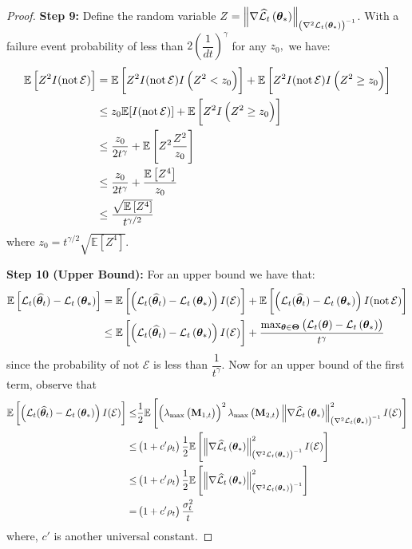 \begin{proof}
\textbf{Step 9:} Define the random variable $Z=\left\|\nabla \widehat{\cal L}_{t}\left(\bm{\theta}_{*}\right)\right\|_{\left(\nabla^{2} {\cal L}_{t}\left(\bm{\theta}_{*}\right)\right)^{-1}}$. With a failure event probability of less than $2\left(\dfrac{1}{dt}\right)^{\gamma}$ for any $z_{0},$ we have:
\begin{align*}
\mathbb{E}\left[Z^{2} I(\operatorname{not} \mathcal{E})\right] &=\mathbb{E}\left[Z^{2} I(\operatorname{not} \mathcal{E}) I\left(Z^{2} < z_{0}\right)\right]+\mathbb{E}\left[Z^{2} I(\operatorname{not} \mathcal{E}) I\left(Z^{2} \geq z_{0}\right)\right] \\
& \leq z_{0} \mathbb{E}[I(\operatorname{not} \mathcal{E})]+\mathbb{E}\left[Z^{2} I\left(Z^{2} \geq z_{0}\right)\right] \\
& \leq \frac{z_{0}}{2 t^{\gamma}}+\mathbb{E}\left[Z^{2} \frac{Z^{2}}{z_{0}}\right] \\
& \leq \frac{z_{0}}{2 t^{\gamma}}+\frac{\mathbb{E}\left[Z^{4}\right]}{z_{0}} \\
& \leq \frac{\sqrt{\mathbb{E}\left[Z^{4}\right]}}{t^{\gamma / 2}}
\end{align*}
where $z_{0}=t^{\gamma / 2} \sqrt{\mathbb{E}\left[Z^{4}\right]}$.

\textbf{Step 10 (Upper Bound): } For an upper bound we have that:
\begin{align*}
\mathbb{E}\left[{\cal L}_{t}({\widehat{\bm{\theta}}}_{t})-{\cal L}_{t}\left(\bm{\theta}_{*}\right)\right] &=\mathbb{E}\left[\left({\cal L}_{t}({\widehat{\bm{\theta}}}_{t})-{\cal L}_{t}\left(\bm{\theta}_{*}\right)\right) I(\mathcal{E})\right]+\mathbb{E}\left[\left({\cal L}_{t}({\widehat{\bm{\theta}}}_{t})-{\cal L}_{t}\left(\bm{\theta}_{*}\right)\right) I(\operatorname{not} \mathcal{E})\right] \\
& \leq \mathbb{E}\left[\left({\cal L}_{t}({\widehat{\bm{\theta}}}_{t})-{\cal L}_{t}\left(\bm{\theta}_{*}\right)\right) I(\mathcal{E})\right]+\frac{\max_{\bm{\theta} \in \bm{\Theta}}\left({\cal L}_{t}(\bm{\theta})-{\cal L}_{t}\left(\bm{\theta}_{*}\right)\right)}{t^{\gamma}}
\end{align*}
since the probability of not $\mathcal{E}$ is less than $\dfrac{1}{t^{\gamma}}$. Now for an upper bound of the first term, observe that
\begin{align*}
\mathbb{E}\left[\left({\cal L}_{t}({\widehat{\bm{\theta}}}_{t})-{\cal L}_{t}\left(\bm{\theta}_{*}\right)\right) I(\mathcal{E})\right] 
\leq & \frac{1}{2} \mathbb{E}\left[\left(\lambda_{\max }\left(\mathbf{M}_{1, t}\right)\right)^{2} \lambda_{\max }\left(\mathbf{M}_{2, t}\right)\left\|\nabla \widehat{\cal L}_{t}\left(\bm{\theta}_{*}\right)\right\|_{\left(\nabla^{2} {\cal L}_{t}\left(\bm{\theta}_{*}\right)\right)^{-1}}^{2} I(\mathcal{E})\right] \\
\leq &\left(1+c^{\prime} \rho_t\right) \frac{1}{2} \mathbb{E}\left[\left\|\nabla \widehat{\cal L}_{t}\left(\bm{\theta}_{*}\right)\right\|_{\left(\nabla^{2} {\cal L}_{t}\left(\bm{\theta}_{*}\right)\right)^{-1}}^{2} I(\mathcal{E})\right] \\
\leq &\left(1+c^{\prime} \rho_t\right) \frac{1}{2} \mathbb{E}\left[\left\|\nabla \widehat{\cal L}_{t}\left(\bm{\theta}_{*}\right)\right\|_{\left(\nabla^{2} {\cal L}_{t}\left(\bm{\theta}_{*}\right)\right)^{-1}}^{2}\right] \\
=&\left(1+c^{\prime} \rho_t\right) \frac{\sigma^{2}_t}{t}
\end{align*}
where, $c'$ is another universal constant.
\end{proof}
